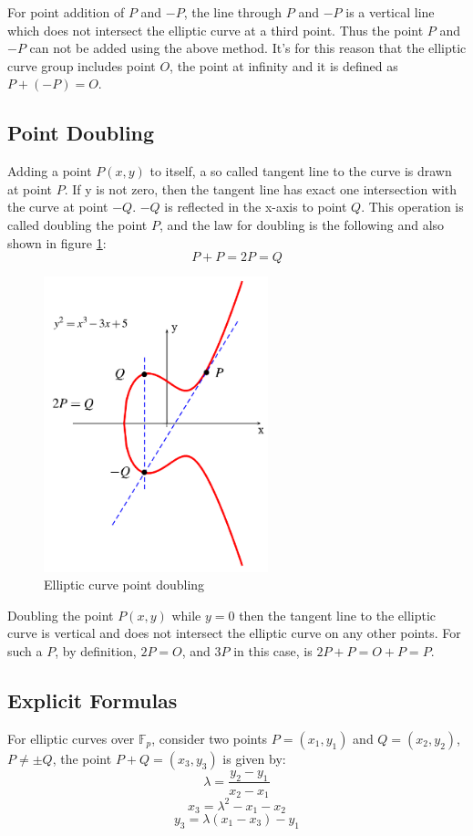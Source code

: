 For point addition of $P$ and $-P$, the line through $P$ and $-P$ is a vertical line which does not intersect the elliptic curve at a third point. Thus the point $P$ and $-P$ can not be added using the above method. It's for this reason that the elliptic curve group includes point $O$, the point at infinity and it is defined as $P + (-P) = O$. 

\subsection{Point Doubling}
Adding a point $P(x,y)$ to itself, a so called tangent line to the curve is drawn at point $P$. If y is not zero, then the tangent line has exact one intersection with the curve at point $-Q$. $-Q$ is reflected in the x-axis to point $Q$. This operation is called doubling the point $P$, and the law for doubling is the following and also shown in figure \ref{fig:ecc_point_doubling}: 
$$P+P=2P=Q$$ 

    \begin{figure}[h!]
    	\centering
    	\includegraphics[width=65mm]{./pics/ecc_point_doubling.png}
    	\caption{Elliptic curve point doubling}
    	\label{fig:ecc_point_doubling}
    \end{figure}
    
Doubling the point $P(x,y)$ while $ y=0 $ then the tangent line to the elliptic curve is vertical and does not intersect the elliptic curve on any other points. For such a $P$, by definition, $2P=O$, and $3P$ in this case, is $2P+P = O + P = P$.   

\subsection{Explicit Formulas} \label{sec:affine_formulas}
For elliptic curves over $\mathbb{F}_p$, consider two points $P=(x_1,y_1)$ and $Q=(x_2,y_2)$, $P \neq \pm Q$, the point $P+Q = (x_3,y_3)$ is given by:
$$\lambda = \frac{y_2-y_1}{x_2-x_1}$$
$$x_3=\lambda^2-x_1-x_2$$
$$y_3=\lambda(x_1-x_3)-y_1$$

